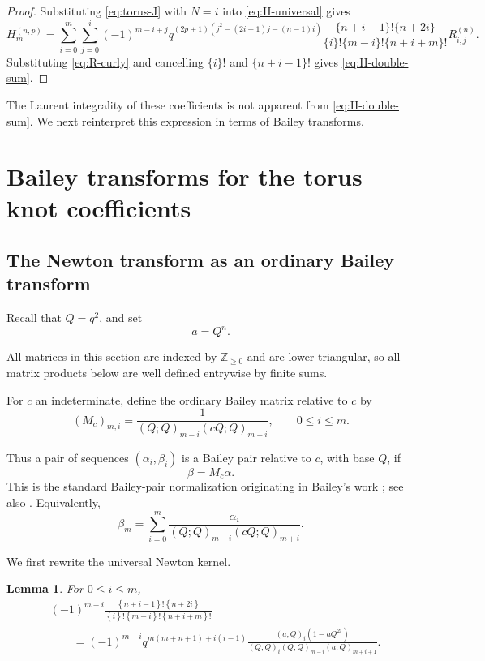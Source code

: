 \documentclass[11pt]{amsart}
\newtheorem{lemma}[theorem]{Lemma}
\newcommand{\curly}[1]{\left\{#1\right\}}
\begin{document}
\begin{proof}
Substituting \eqref{eq:torus-J} with \(N=i\) into
\eqref{eq:H-universal} gives
\[
H_m^{(n,p)}
=
\sum_{i=0}^{m}\sum_{j=0}^{i}
(-1)^{m-i+j}
q^{(2p+1)(j^2-(2i+1)j-(n-1)i)}
\frac{\{n+i-1\}!\{n+2i\}}
{\{i\}!\{m-i\}!\{n+i+m\}!}
R_{i,j}^{(n)}.
\]
Substituting \eqref{eq:R-curly} and cancelling
\(\{i\}!\) and \(\{n+i-1\}!\) gives
\eqref{eq:H-double-sum}.
\end{proof}

The Laurent integrality of these coefficients is not apparent from
\eqref{eq:H-double-sum}.  We next reinterpret this expression in terms
of Bailey transforms.



\section{Bailey transforms for the torus knot coefficients}
\label{sec:bailey}

\subsection{The Newton transform as an ordinary Bailey transform}

Recall that \(Q=q^2\), and set
\[
a=Q^n.
\]

All matrices in this section are indexed by \(\mathbb Z_{\geq0}\) and
are lower triangular, so all matrix products below are well defined
entrywise by finite sums.

For \(c\) an indeterminate, define the ordinary Bailey matrix
relative to \(c\) by
\begin{equation}\label{eq:Bailey-matrix}
(M_c)_{m,i}
=
\frac{1}{
(Q;Q)_{m-i}(cQ;Q)_{m+i}},
\qquad
0\leq i\leq m.
\end{equation}

Thus a pair of sequences \((\alpha_i,\beta_i)\) is a Bailey pair
relative to \(c\), with base \(Q\), if
\[
\beta=M_c\alpha.
\]
This is the standard Bailey-pair normalization originating in
Bailey's work \cite{Bailey}; see also \cite{AndrewsQSeries}.  Equivalently,
\begin{equation}\label{eq:Bailey-pair}
\beta_m
=
\sum_{i=0}^{m}
\frac{\alpha_i}{
(Q;Q)_{m-i}(cQ;Q)_{m+i}}.
\end{equation}

We first rewrite the universal Newton kernel.

\begin{lemma}\label{lem:newton-Q-kernel}
For \(0\leq i\leq m\),
\begin{align}
&(-1)^{m-i}
\frac{
\curly{n+i-1}!\curly{n+2i}
}{
\curly{i}!\curly{m-i}!\curly{n+i+m}!
}
\nonumber\\
&\qquad=
(-1)^{m-i}
q^{m(m+n+1)+i(i-1)}
\frac{
(a;Q)_i(1-aQ^{2i})
}{
(Q;Q)_i(Q;Q)_{m-i}(a;Q)_{m+i+1}
}.
\label{eq:newton-Q-kernel}
\end{align}
\end{lemma}
\end{document}

